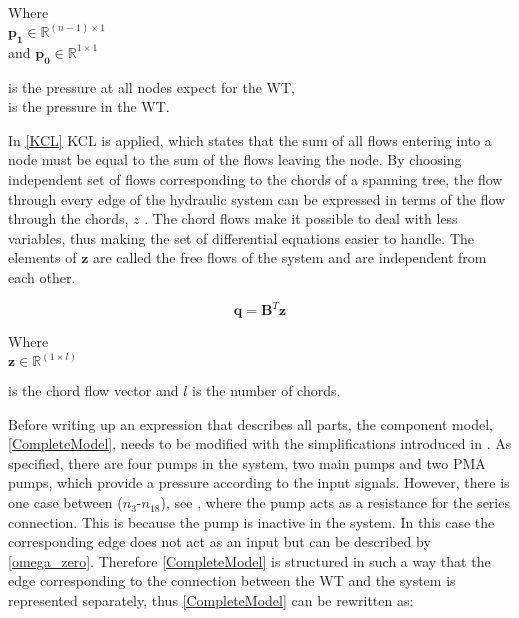 \begin{minipage}[t]{0.24\textwidth}
Where\\
\hspace*{8mm} $\bm{p_1} \in \mathbb{R}^{(n-1) \times 1}$  \\
and \hspace*{0.7mm} $\bm{p_0} \in \mathbb{R}^{1 \times 1} $ 
\end{minipage}
\begin{minipage}[t]{0.68\textwidth}
\vspace*{2mm}
\hspace*{4mm} is the pressure at all nodes expect for the WT,\\
\hspace*{4mm} is the pressure in the WT.
\end{minipage}

In \eqref{KCL} KCL is applied, which states that the sum of all flows entering into a node must be equal to the sum of the flows leaving the node. By choosing independent set of flows corresponding to the chords of a spanning tree, the flow through every edge of the hydraulic system can be expressed in terms of the flow through the chords, $z$ \cite{GraphModel}.
The chord flows make it possible to deal with less variables, thus making the set of differential equations easier to handle.  The elements of $\bm{z}$ are called the free flows of the system and are independent from each other\cite{GraphTheoryCarsten}.

\begin{equation}
  \bm{q} = \bm{B} ^{T}  \bm{z}
  \label{ChordRelation}
\end{equation}

\begin{minipage}[t]{0.20\textwidth}
Where\\
\hspace*{8mm} $\bm{z} \in \mathbb{R}^{(1 \times l)} $ 
\end{minipage}
\begin{minipage}[t]{0.68\textwidth}
\vspace*{2mm}
\hspace*{4mm} is the chord flow vector and $l$ is the number of chords.
\end{minipage}

Before writing up an expression that describes all parts, the component model, \eqref{CompleteModel}, needs to be modified with the simplifications introduced in . As specified, there are four pumps in the system, two main pumps and two PMA pumps, which provide a pressure according to the input signals. However, there is one case between ($n_3$-$n_{18}$), see , where the pump acts as a resistance for the series connection. This is because the pump is inactive in the system. In this case the corresponding edge does not act as an input but can be described by \eqref{omega_zero}. Therefore \eqref{CompleteModel} is structured in such a way that the edge corresponding to the connection between the WT and the system is represented separately, thus \eqref{CompleteModel} can be rewritten as:%


